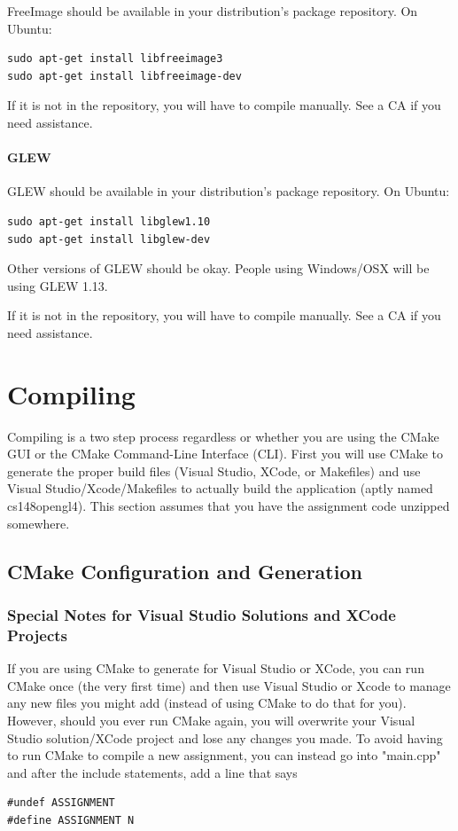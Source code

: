 \documentclass{article}
\begin{document}
FreeImage should be available in your distribution's package repository. On Ubuntu:

\begin{lstlisting}
sudo apt-get install libfreeimage3
sudo apt-get install libfreeimage-dev
\end{lstlisting}

If it is not in the repository, you will have to compile manually. See a CA if you need assistance.

\paragraph{\textbf{GLEW}}

GLEW should be available in your distribution's package repository. On Ubuntu:

\begin{lstlisting}
sudo apt-get install libglew1.10
sudo apt-get install libglew-dev
\end{lstlisting}

Other versions of GLEW should be okay. People using Windows/OSX will be using GLEW 1.13.

If it is not in the repository, you will have to compile manually. See a CA if you need assistance.

\section*{Compiling}

Compiling is a two step process regardless or whether you are using the CMake GUI or the CMake Command-Line Interface (CLI). First you will use CMake to generate the proper build files (Visual Studio, XCode, or Makefiles) and use Visual Studio/Xcode/Makefiles to actually build the application (aptly named cs148opengl4). This section assumes that you have the assignment code unzipped somewhere. 

\subsection*{CMake Configuration and Generation}

\subsubsection*{Special Notes for Visual Studio Solutions and XCode Projects}

If you are using CMake to generate for Visual Studio or XCode, you can run CMake once (the very first time) and then use Visual Studio or Xcode to manage any new files you might add (instead of using CMake to do that for you). However, should you ever run CMake again, you will overwrite your Visual Studio solution/XCode project and lose any changes you made. To avoid having to run CMake to compile a new assignment, you can instead go into "main.cpp" and after the include statements, add a line that says 
\begin{lstlisting}
#undef ASSIGNMENT
#define ASSIGNMENT N
\end{lstlisting}
\end{document}
